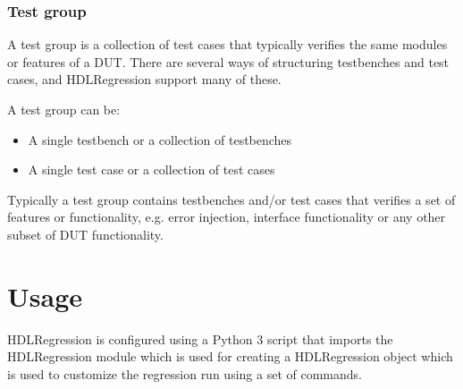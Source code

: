 \documentclass[letterpaper,10pt,english]{sphinxmanual}
\let\sphinxpxdimen\pdfpxdimen\else\newdimen\sphinxpxdimen
\begin{document}
\subsection{Test group}
\label{\detokenize{intro:test-group}}
\sphinxAtStartPar
A test group is a collection of test cases that typically verifies the same modules or features of a DUT.
There are several ways of structuring testbenches and test cases, and HDLRegression support many of these.

\sphinxAtStartPar
A test group can be:
\begin{itemize}
\item {} 
\sphinxAtStartPar
A single testbench or a collection of testbenches

\item {} 
\sphinxAtStartPar
A single test case or a collection of test cases

\end{itemize}

\sphinxAtStartPar
Typically a test group contains testbenches and/or test cases that verifies a set of features or functionality,
e.g. error injection, interface functionality or any other sub\sphinxhyphen{}set of DUT functionality.

\noindent{\hspace*{\fill}\sphinxincludegraphics[width=400\sphinxpxdimen]{{test_group}.png}\hspace*{\fill}}


\chapter{Usage}
\label{\detokenize{intro:usage}}
\sphinxAtStartPar
HDLRegression is configured using a Python 3 script that imports the HDLRegression module which is used for creating a HDLRegression
object which is used to customize the regression run using a set of {\hyperref[\detokenize{api::doc}]{}} commands.
\end{document}
